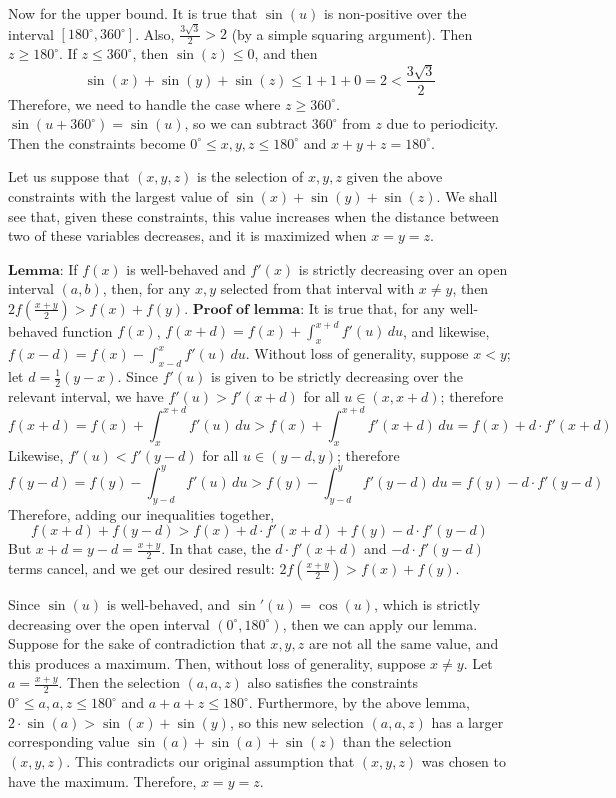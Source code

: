 \begin{enumerate}
 Now for the upper bound. It is true that $\sin(u)$ is non-positive over the interval $[180^\circ, 360^\circ]$.  Also, $\frac{3\sqrt{3}}{2}>2$ (by a simple squaring argument). Then $z \ge 180^\circ$.  If $z \le 360^\circ$, then $\sin (z) \le 0$, and then
 \[\sin (x) + \sin (y) + \sin (z) \le 1 + 1 + 0 = 2 < \frac{3\sqrt{3}}{2}\]Therefore, we need to handle the case where $z \ge 360^\circ$. $\sin(u + 360^\circ) = \sin(u)$, so we can subtract $360^\circ$ from $z$ due to periodicity. Then the constraints become $0^\circ \le x,y,z \le 180^\circ$ and $x+y+z = 180^\circ$.

 Let us suppose that $(x,y,z)$ is the selection of $x,y,z$ given the above constraints with the largest value of $\sin (x) + \sin (y) + \sin (z)$. We shall see that, given these constraints, this value increases when the distance between two of these variables decreases, and it is maximized when $x=y=z$.

 $\textbf{Lemma:}$ If $f(x)$ is well-behaved and $f'(x)$ is strictly decreasing over an open interval $(a, b)$, then, for any $x,y$ selected from that interval with $x \ne y$, then $2f\left(\frac{x + y}{2}\right) > f(x) + f(y).$
$\textbf{Proof of lemma:}$ It is true that, for any well-behaved function $f(x)$, $f(x+d) = f(x) + \int_{x}^{x+d} f'(u)\,du$, and likewise, $f(x-d) = f(x) - \int_{x-d}^x f'(u)\,du$. Without loss of generality, suppose $x < y$; let $d = \frac{1}{2}(y-x)$.  Since $f'(u)$ is given to be strictly decreasing over the relevant interval, we have $f'(u) > f'(x+d)$ for all $u\in(x, x+d)$; therefore
 \[f(x+d) = f(x) + \int_x^{x+d} f'(u)\,du > f(x) + \int_x^{x+d} f'(x+d)\,du = f(x) + d\cdot f'(x+d)\]Likewise, $f'(u) < f'(y-d)$ for all $u\in(y-d, y)$; therefore
 \[f(y-d) = f(y) - \int_{y-d}^y f'(u)\,du > f(y) - \int_{y-d}^y f'(y-d)\,du = f(y) - d\cdot f'(y-d)\]Therefore, adding our inequalities together,
 \[f(x+d) + f(y-d) > f(x) + d\cdot f'(x+d) + f(y) - d\cdot f'(y-d)\]But $x+d = y-d = \frac{x+y}{2}$. In that case, the $d\cdot f'(x+d)$ and $-d\cdot f'(y-d)$ terms cancel, and we get our desired result: $2 f\left(\frac{x+y}{2}\right) > f(x) + f(y)$.

 Since $\sin(u)$ is well-behaved, and $\sin'(u) = \cos(u)$, which is strictly decreasing over the open interval $(0^\circ, 180^\circ)$, then we can apply our lemma. Suppose for the sake of contradiction that $x,y,z$ are not all the same value, and this produces a maximum. Then, without loss of generality, suppose $x \ne y$. Let $a = \frac{x+y}{2}$. Then the selection $(a,a,z)$ also satisfies the constraints $0^\circ \le a,a,z \le 180^\circ$ and $a+a+z \le 180^\circ$. Furthermore, by the above lemma, $2\cdot\sin (a) > \sin (x) + \sin (y)$, so this new selection $(a,a,z)$ has a larger corresponding value $\sin (a) + \sin (a) + \sin (z)$ than the selection $(x,y,z)$. This contradicts our original assumption that $(x,y,z)$ was chosen to have the maximum. Therefore, $x=y=z$.


\end{enumerate}
